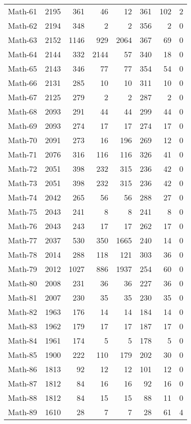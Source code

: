 \begin{footnotesize}
\begin{longtable}{lrrrrrrc}
Math-61 &  2195 & 361 & 46 & 12 & 361  & 102 & 2\\
Math-62 &  2194 & 348 & 2 & 2 & 356  & 2 & 0\\
Math-63 &  2152 & 1146 & 929 & 2064 & 367  & 69 & 0\\
Math-64 &  2144 & 332 & 2144 & 57 & 340  & 18 & 0\\
Math-65 &  2143 & 346 & 77 & 77 & 354  & 54 & 0\\
Math-66 &  2131 & 285 & 10 & 10 & 311  & 10 & 0\\
Math-67 &  2125 & 279 & 2 & 2 & 287  & 2 & 0\\
Math-68 &  2093 & 291 & 44 & 44 & 299  & 44 & 0\\
Math-69 &  2093 & 274 & 17 & 17 & 274  & 17 & 0\\
Math-70 &  2091 & 273 & 16 & 196 & 269  & 12 & 0\\
Math-71 &  2076 & 316 & 116 & 116 & 326  & 41 & 0\\
Math-72 &  2051 & 398 & 232 & 315 & 236  & 42 & 0\\
Math-73 &  2051 & 398 & 232 & 315 & 236  & 42 & 0\\
Math-74 &  2042 & 265 & 56 & 56 & 288  & 27 & 0\\
Math-75 &  2043 & 241 & 8 & 8 & 241  & 8 & 0\\
Math-76 &  2043 & 243 & 17 & 17 & 262  & 17 & 0\\
Math-77 &  2037 & 530 & 350 & 1665 & 240  & 14 & 0\\
Math-78 &  2014 & 288 & 118 & 121 & 303  & 36 & 0\\
Math-79 &  2012 & 1027 & 886 & 1937 & 254  & 60 & 0\\
Math-80 &  2008 & 231 & 36 & 36 & 227  & 36 & 0\\
Math-81 &  2007 & 230 & 35 & 35 & 230  & 35 & 0\\
Math-82 &  1963 & 176 & 14 & 14 & 184  & 14 & 0\\
Math-83 &  1962 & 179 & 17 & 17 & 187  & 17 & 0\\
Math-84 &  1961 & 174 & 5 & 5 & 178  & 5 & 0\\
Math-85 &  1900 & 222 & 110 & 179 & 202  & 30 & 0\\
Math-86 &  1813 & 92 & 12 & 12 & 101  & 12 & 0\\
Math-87 &  1812 & 84 & 16 & 16 & 92  & 16 & 0\\
Math-88 &  1812 & 84 & 15 & 15 & 88  & 11 & 0\\
Math-89 &  1610 & 28 & 7 & 7 & 28  & 61 & 4\\

\end{longtable}
\end{footnotesize}
